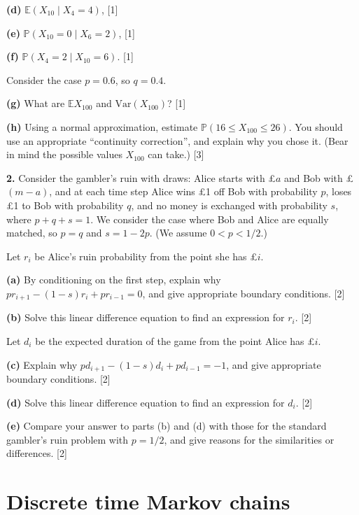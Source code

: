 \documentclass[
  a4paper,
]{article}
\theoremstyle{definition}
\theoremstyle{definition}
\theoremstyle{definition}
\theoremstyle{remark}
\begin{document}
\textbf{(d)} \(\mathbb E(X_{10} \mid X_4 = 4)\), {{[}1{]}}

\textbf{(e)} \(\mathbb P(X_{10} = 0 \mid X_6 = 2)\), {{[}1{]}}

\textbf{(f)} \(\mathbb P(X_4 = 2 \mid X_{10} = 6)\). {{[}1{]}}

Consider the case \(p = 0.6\), so \(q = 0.4\).

\textbf{(g)} What are \(\mathbb E X_{100}\) and \(\text{Var}(X_{100})\)? {{[}1{]}}

\textbf{(h)} Using a normal approximation, estimate \(\mathbb P(16 \leq X_{100} \leq 26)\). You should use an appropriate ``continuity correction'', and explain why you chose it. (Bear in mind the possible values \(X_{100}\) can take.) {{[}3{]}}

\textbf{2.} Consider the gambler's ruin with draws: Alice starts with £\(a\) and Bob with £\((m-a)\), and at each time step Alice wins £1 off Bob with probability \(p\), loses £1 to Bob with probability \(q\), and no money is exchanged with probability \(s\), where \(p+q+s =1\). We consider the case where Bob and Alice are equally matched, so \(p = q\) and \(s = 1-2p\). (We assume \(0 < p < 1/2\).)

Let \(r_i\) be Alice's ruin probability from the point she has £\(i\).

\textbf{(a)} By conditioning on the first step, explain why \(pr_{i+1} - (1-s)r_i + pr_{i-1} = 0\), and give appropriate boundary conditions. {{[}2{]}}

\textbf{(b)} Solve this linear difference equation to find an expression for \(r_i\). {{[}2{]}}

Let \(d_i\) be the expected duration of the game from the point Alice has £\(i\).

\textbf{(c)} Explain why \(pd_{i+1} - (1-s)d_i + pd_{i-1} = -1\), and give appropriate boundary conditions. {{[}2{]}}

\textbf{(d)} Solve this linear difference equation to find an expression for \(d_i\). {{[}2{]}}

\textbf{(e)} Compare your answer to parts (b) and (d) with those for the standard gambler's ruin problem with \(p = 1/2\), and give reasons for the similarities or differences. {{[}2{]}}

\hypertarget{S05-markov-chains}{%
\section{Discrete time Markov chains}\label{S05-markov-chains}}
\end{document}
